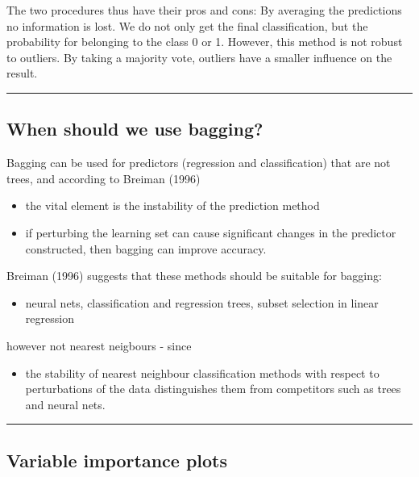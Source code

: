 \documentclass[]{article}
\providecommand{\tightlist}{%
  \setlength{\itemsep}{0pt}\setlength{\parskip}{0pt}}
\begin{document}
The two procedures thus have their pros and cons: By averaging the
predictions no information is lost. We do not only get the final
classification, but the probability for belonging to the class 0 or 1.
However, this method is not robust to outliers. By taking a majority
vote, outliers have a smaller influence on the result.

\begin{center}\rule{0.5\linewidth}{\linethickness}\end{center}

\hypertarget{when-should-we-use-bagging}{%
\subsection{When should we use
bagging?}\label{when-should-we-use-bagging}}

Bagging can be used for predictors (regression and classification) that
are not trees, and according to Breiman (1996)

\begin{itemize}
\tightlist
\item
  the vital element is the instability of the prediction method
\item
  if perturbing the learning set can cause significant changes in the
  predictor constructed, then bagging can improve accuracy.
\end{itemize}

Breiman (1996) suggests that these methods should be suitable for
bagging:

\begin{itemize}
\tightlist
\item
  neural nets, classification and regression trees, subset selection in
  linear regression
\end{itemize}

however not nearest neigbours - since

\begin{itemize}
\tightlist
\item
  the stability of nearest neighbour classification methods with respect
  to perturbations of the data distinguishes them from competitors such
  as trees and neural nets.
\end{itemize}

\begin{center}\rule{0.5\linewidth}{\linethickness}\end{center}

\hypertarget{variable-importance-plots}{%
\subsection{Variable importance plots}\label{variable-importance-plots}}
\end{document}

